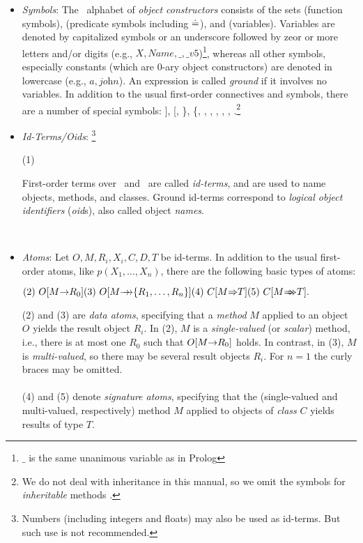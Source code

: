\documentclass[11pt]{report}
\begin{document}
\begin{itemize}
\item \emph{Symbols}: The \fl\ alphabet of \emph{object constructors}
  consists of the sets \funcs (function symbols), \preds (predicate symbols
  including $\doteq$), and \vars (variables).  Variables are denoted by
  capitalized symbols or an underscore followed by zeor or more letters
  and/or digits (e.g., $X,\textit{Name}, \_, \_v5$)\footnote{$\_$ is the same
  unanimous variable as in Prolog}, whereas all other symbols,
  especially constants (which are 0-ary object constructors) are denoted in
  lowercase (e.g., $a,\textit{john}$).  An expression is called
  \emph{ground} if it involves no variables.  In addition to the usual
  first-order connectives and symbols, there are a number of special
  symbols: ], [, \}, \{, \fd, \mvd, \Fd, \Mvd,
  \isa, \subcl.\footnote{
    We do not deal with inheritance in this manual, so we
    omit the symbols for \emph{inheritable} methods
    \cite{KLW95}.
    }
\item \emph{Id-Terms/Oids}:%
\footnote{
    Numbers (including integers and floats) may also be used as id-terms. But
    such use is not recommended.}%
\medskip
  
  \hfill (1)
  \begin{minipage}[t]{.80\textwidth}
    First-order terms over \funcs\ and \vars\ are called
    \emph{id-terms}, and are used to name objects, methods, and
    classes.  Ground id-terms correspond to \emph{logical object
      identifiers} (\emph{oid}s), also called object \emph{names}.
  \end{minipage}
  \hfill ~
\item \emph{Atoms}: Let $O,M,R_{i},X_{i},C,D,T$ be id-terms.  In
  addition to the usual first-order atoms, like $p(X_1,\dots,X_n)$, there
  are the following basic types of atoms: \medskip

  \begin{math}
    \hfill (2)~O[M\fd R_0] \hfill (3)~O[M\mvd \{R_1,\dots,R_n\}]
    \hfill (4)~C[M\Fd T] \hfill (5)~C[M\Mvd T]. \hfill
  \end{math} \medskip
  
  (2) and (3) are \emph{data atoms}, specifying that a \emph{method} $M$
  applied to an object $O$ yields the result object $R_i$. In (2), $M$ is a
  \emph{single-valued} (or \emph{scalar}) method, i.e., there is
  at most one $R_0$ such that $O[M{\rightarrow} R_0]$ holds. In contrast, in
  (3), $M$ is \emph{multi-valued}, so there may be several result
  objects $R_i$. For $n=1$ the curly braces may be omitted.\\
  \\
  (4) and (5) denote \emph{signature atoms}, specifying that the
  (single-valued and multi-valued, respectively) method $M$ applied to
  objects of \emph{class} $C$ yields results of type $T$.
  

\end{itemize}
\end{document}
